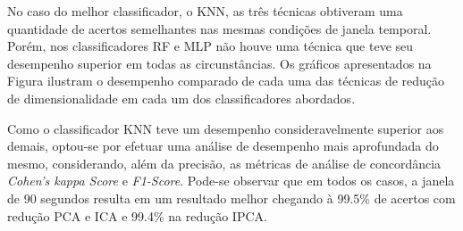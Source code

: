 No caso do melhor classificador, o KNN, as três técnicas obtiveram uma quantidade de acertos semelhantes nas mesmas condições de janela temporal. Porém, nos classificadores RF e MLP não houve uma técnica que teve seu desempenho superior em todas as circunstâncias. Os gráficos apresentados na Figura ilustram o desempenho comparado de cada uma das técnicas de redução de dimensionalidade em cada um dos classificadores abordados.

Como o classificador KNN teve um desempenho consideravelmente superior aos demais, optou-se por efetuar uma análise de desempenho mais aprofundada do mesmo, considerando, além da precisão, as métricas de análise de concordância \textit{Cohen's kappa Score} e \textit{F1-Score}. Pode-se observar que em todos os casos, a janela de 90 segundos resulta em um resultado melhor chegando à 99.5\% de acertos com redução PCA e ICA e 99.4\% na redução IPCA.

\begin{table}[htb]
\centering
\caption{Desempenho do Classificador KNN e Redução de Dimensionalidade PCA em diferentes métricas}
\label{tab:desPCA}
\end{table}


